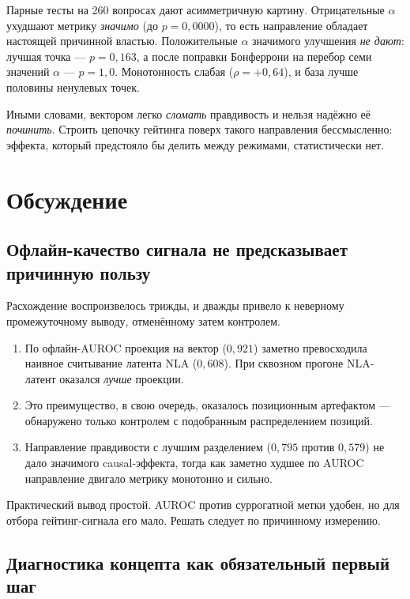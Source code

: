\documentclass[11pt,a4paper]{article}
\begin{document}
Парные тесты на 260 вопросах дают асимметричную картину. Отрицательные
$\alpha$ ухудшают метрику \emph{значимо} (до $p=0{,}0000$), то есть направление
обладает настоящей причинной властью. Положительные $\alpha$ значимого улучшения
\emph{не дают}: лучшая точка --- $p=0{,}163$, а после поправки Бонферрони на
перебор семи значений $\alpha$ --- $p=1{,}0$. Монотонность слабая
($\rho=+0{,}64$), и база лучше половины ненулевых точек.

Иными словами, вектором легко \emph{сломать} правдивость и нельзя надёжно её
\emph{починить}. Строить цепочку гейтинга поверх такого направления
бессмысленно: эффекта, который предстояло бы делить между режимами,
статистически нет.

\section{Обсуждение}

\subsection{Офлайн-качество сигнала не предсказывает причинную пользу}

Расхождение воспроизвелось трижды, и дважды привело к неверному промежуточному
выводу, отменённому затем контролем.

\begin{enumerate}
\item По офлайн-AUROC проекция на вектор ($0{,}921$) заметно превосходила
      наивное считывание латента NLA ($0{,}608$). При сквозном прогоне
      NLA-латент оказался \emph{лучше} проекции.
\item Это преимущество, в свою очередь, оказалось позиционным артефактом ---
      обнаружено только контролем с подобранным распределением позиций.
\item Направление правдивости с лучшим разделением ($0{,}795$ против $0{,}579$)
      не дало значимого causal-эффекта, тогда как заметно худшее по AUROC
      направление двигало метрику монотонно и сильно.
\end{enumerate}

Практический вывод простой. AUROC против суррогатной метки удобен, но для отбора
гейтинг-сигнала его мало. Решать следует по причинному измерению.

\subsection{Диагностика концепта как обязательный первый шаг}
\end{document}
